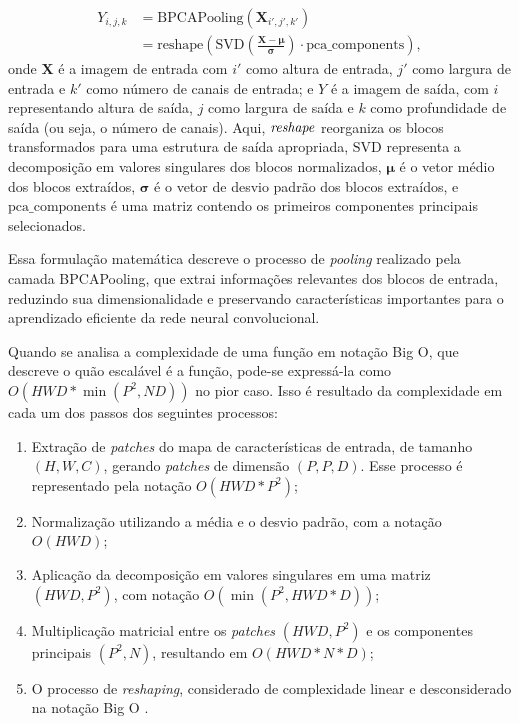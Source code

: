 \begin{equation}
    \label{project:eq:bpca}
    \begin{split}
        Y_{i,j,k} &= \text{BPCAPooling}(\boldsymbol{X}_{i',j',k'}) \\
                  &= \text{reshape}\left(\text{SVD}\left(\frac{{\boldsymbol{X} - \boldsymbol{\mu}}}{{\boldsymbol{\sigma}}}\right) \cdot \text{pca\_components}\right),
    \end{split}
\end{equation}
onde $\boldsymbol{X}$ é a imagem de entrada com $i'$ como altura de entrada, $j'$ como largura de entrada e $k'$ como número de canais de entrada; e $Y$ é a imagem de saída, com $i$ representando altura de saída, $j$ como largura de saída e $k$ como profundidade de saída (ou seja, o número de canais). Aqui, $\text{\textit{reshape}}$ reorganiza os blocos transformados para uma estrutura de saída apropriada, $\text{SVD}$ representa a decomposição em valores singulares dos blocos normalizados, $\boldsymbol{\mu}$ é o vetor médio dos blocos extraídos, $\boldsymbol{\sigma}$ é o vetor de desvio padrão dos blocos extraídos, e $\text{pca\_components}$ é uma matriz contendo os primeiros componentes principais selecionados.

Essa formulação matemática descreve o processo de \textit{pooling} realizado pela camada BPCAPooling, que extrai informações relevantes dos blocos de entrada, reduzindo sua dimensionalidade e preservando características importantes para o aprendizado eficiente da rede neural convolucional.

Quando se analisa a complexidade de uma função em notação Big O, que descreve o quão escalável é a função, pode-se expressá-la como $O(HWD * \min(P^2, ND))$ no pior caso. Isso é resultado da complexidade em cada um dos passos dos seguintes processos:

\begin{enumerate}
    \item Extração de \textit{patches} do mapa de características de entrada, de tamanho $(H,W,C)$, gerando \textit{patches} de dimensão $(P,P,D)$. Esse processo é representado pela notação $O(HWD * P^2)$;
    \item Normalização utilizando a média e o desvio padrão, com a notação $O(HWD)$;
    \item Aplicação da decomposição em valores singulares em uma matriz $(HWD, P^2)$, com notação $O(\min(P^2, HWD * D))$;
    \item Multiplicação matricial entre os \textit{patches} $(HWD, P^2)$ e os componentes principais $(P^2, N)$, resultando em $O(HWD * N * D)$;
    \item O processo de \textit{reshaping}, considerado de complexidade linear e desconsiderado na notação Big O \citep{devi2011abstract}.
\end{enumerate}

